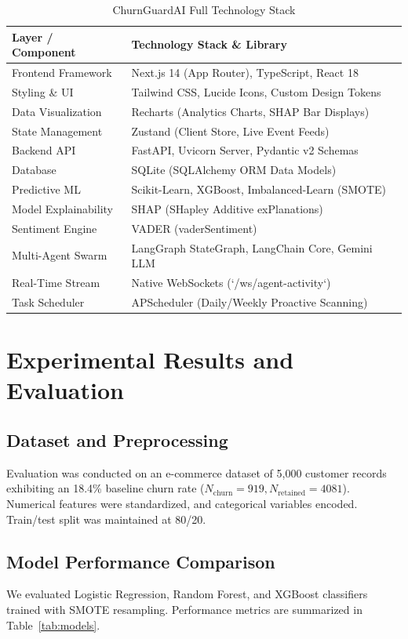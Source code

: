 \documentclass[conference]{IEEEtran}
\begin{document}
\begin{table}[h]
\caption{ChurnGuardAI Full Technology Stack}
\label{tab:techstack}
\centering
\begin{tabular}{|l|l|}
\hline
\textbf{Layer / Component} & \textbf{Technology Stack \& Library} \\ \hline
Frontend Framework & Next.js 14 (App Router), TypeScript, React 18 \\ \hline
Styling \& UI & Tailwind CSS, Lucide Icons, Custom Design Tokens \\ \hline
Data Visualization & Recharts (Analytics Charts, SHAP Bar Displays) \\ \hline
State Management & Zustand (Client Store, Live Event Feeds) \\ \hline
Backend API & FastAPI, Uvicorn Server, Pydantic v2 Schemas \\ \hline
Database & SQLite (SQLAlchemy ORM Data Models) \\ \hline
Predictive ML & Scikit-Learn, XGBoost, Imbalanced-Learn (SMOTE) \\ \hline
Model Explainability & SHAP (SHapley Additive exPlanations) \\ \hline
Sentiment Engine & VADER (vaderSentiment) \\ \hline
Multi-Agent Swarm & LangGraph StateGraph, LangChain Core, Gemini LLM \\ \hline
Real-Time Stream & Native WebSockets (`/ws/agent-activity`) \\ \hline
Task Scheduler & APScheduler (Daily/Weekly Proactive Scanning) \\ \hline
\end{tabular}
\end{table}

\section{Experimental Results and Evaluation}

\subsection{Dataset and Preprocessing}
Evaluation was conducted on an e-commerce dataset of 5,000 customer records exhibiting an 18.4\% baseline churn rate ($N_{\text{churn}}=919, N_{\text{retained}}=4081$). Numerical features were standardized, and categorical variables encoded. Train/test split was maintained at 80/20.

\subsection{Model Performance Comparison}
We evaluated Logistic Regression, Random Forest, and XGBoost classifiers trained with SMOTE resampling. Performance metrics are summarized in Table~\ref{tab:models}.
\end{document}
